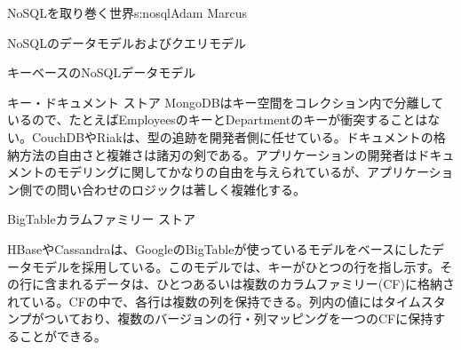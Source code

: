 \begin{aosachapter}{NoSQLを取り巻く世界}{s:nosql}{Adam Marcus}
\begin{aosasect1}{NoSQLのデータモデルおよびクエリモデル}
\begin{aosasect2}{キーベースのNoSQLデータモデル}
\begin{aosasect3}{キー・ドキュメント ストア}
MongoDBはキー空間をコレクション内で分離しているので、たとえばEmployeesのキーとDepartmentのキーが衝突することはない。CouchDBやRiakは、型の追跡を開発者側に任せている。ドキュメントの格納方法の自由さと複雑さは諸刃の剣である。アプリケーションの開発者はドキュメントのモデリングに関してかなりの自由を与えられているが、アプリケーション側での問い合わせのロジックは著しく複雑化する。

\end{aosasect3}

\begin{aosasect3}{BigTableカラムファミリー ストア}

HBaseやCassandraは、GoogleのBigTableが使っているモデルをベースにしたデータモデルを採用している。このモデルでは、キーがひとつの行を指し示す。その行に含まれるデータは、ひとつあるいは複数のカラムファミリー(CF)に格納されている。CFの中で、各行は複数の列を保持できる。列内の値にはタイムスタンプがついており、複数のバージョンの行・列マッピングを一つのCFに保持することができる。


\end{aosasect3}
\end{aosasect2}
\end{aosasect1}
\end{aosachapter}
